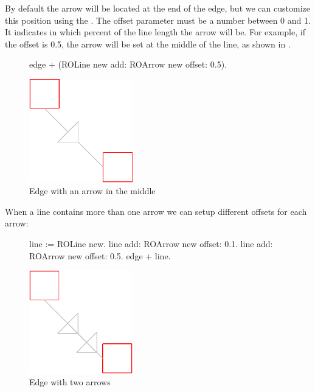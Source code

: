 \documentclass[a4paper,10pt,twoside]{book}
\begin{document}
By default the arrow will be located at the end of the edge, but we can customize this position using the . The offset parameter must be a number between 0 and 1. It indicates in which percent of the line length the arrow will be. For example, if the offset is 0.5, the arrow will be set at the middle of the line, as shown in .

\begin{figure}[H]
\begin{minipage}[t]{0.5\textwidth}
\vspace{0pt}
\begin{code}{}
edge + (ROLine new add: ROArrow new offset: 0.5).\end{code}
\end{minipage}
\hfill
\begin{minipage}[t]{0.38\textwidth}
\vspace{0pt} \raggedright
\centering
\includegraphics[width=0.4\textwidth]{arrowMiddleEdge}
\end{minipage}
\caption{Edge with an arrow in the middle}
\label{fig:arrowMiddleEdge}
\end{figure} 

When a line contains more than one arrow we can setup different offsets for each arrow:

\begin{figure}[H]
      \begin{minipage}[t]{0.5\textwidth}
      \vspace{0pt}
     \begin{code}{}
line := ROLine new.
line add: ROArrow new offset: 0.1.
line add: ROArrow new offset: 0.5.
edge + line. \end{code}
   \end{minipage}
   \hfill
   \begin{minipage}[t]{0.4\textwidth}
      \vspace{0pt} \raggedright
       \centering
		\includegraphics[width=0.4\textwidth]{twoArrowEdge}
   \end{minipage}
\caption{Edge with two arrows}
\label{fig:twoArrowEdge}
\end{figure} 
\end{document}
